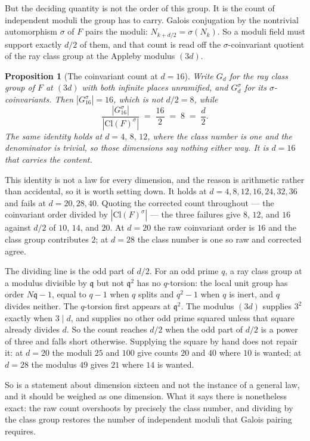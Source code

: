\documentclass[12pt,a4paper]{article}
\newtheorem{proposition}[theorem]{Proposition}
\newcommand{\Fd}{F}
\newcommand{\Cl}{\mathrm{Cl}}
\begin{document}
But the deciding quantity is not the order of this group. It is the count of independent moduli the group has to carry. Galois conjugation by the nontrivial automorphism $\sigma$ of $\Fd$ pairs the moduli: $N_{k+d/2} = \sigma(N_k)$. So a moduli field must support exactly $d/2$ of them, and that count is read off the $\sigma$-coinvariant quotient of the ray class group at the Appleby modulus $(3d)$.

\begin{proposition}[The coinvariant count at $d=16$]
\label{prop:coinv}
Write $G_d$ for the ray class group of $\Fd$ at $(3d)$ with both infinite places unramified, and $G_d^\sigma$ for its $\sigma$-coinvariants. Then $|G_{16}^\sigma| = 16$, which is not $d/2 = 8$, while
\[
\frac{|G_{16}^\sigma|}{|\Cl(\Fd)^\sigma|} \;=\; \frac{16}{2} \;=\; 8 \;=\; \frac{d}{2}.
\]
The same identity holds at $d = 4,\,8,\,12$, where the class number is one and the denominator is trivial, so those dimensions say nothing either way. It is $d=16$ that carries the content.
\end{proposition}

This identity is not a law for every dimension, and the reason is arithmetic rather than accidental, so it is worth setting down. It holds at $d = 4, 8, 12, 16, 24, 32, 36$ and fails at $d = 20, 28, 40$. Quoting the corrected count throughout — the coinvariant order divided by $|\Cl(\Fd)^\sigma|$ — the three failures give $8$, $12$, and $16$ against $d/2$ of $10$, $14$, and $20$. At $d=20$ the raw coinvariant order is $16$ and the class group contributes $2$; at $d=28$ the class number is one so raw and corrected agree.

The dividing line is the odd part of $d/2$. For an odd prime $q$, a ray class group at a modulus divisible by $\mathfrak{q}$ but not $\mathfrak{q}^2$ has no $q$-torsion: the local unit group has order $N\mathfrak{q}-1$, equal to $q-1$ when $q$ splits and $q^2-1$ when $q$ is inert, and $q$ divides neither. The $q$-torsion first appears at $\mathfrak{q}^2$. The modulus $(3d)$ supplies $3^2$ exactly when $3 \mid d$, and supplies no other odd prime squared unless that square already divides $d$. So the count reaches $d/2$ when the odd part of $d/2$ is a power of three and falls short otherwise. Supplying the square by hand does not repair it: at $d=20$ the moduli $25$ and $100$ give counts $20$ and $40$ where $10$ is wanted; at $d=28$ the modulus $49$ gives $21$ where $14$ is wanted.

So  is a statement about dimension sixteen and not the instance of a general law, and it should be weighed as one dimension. What it says there is nonetheless exact: the raw count overshoots by precisely the class number, and dividing by the class group restores the number of independent moduli that Galois pairing requires.
\end{document}

